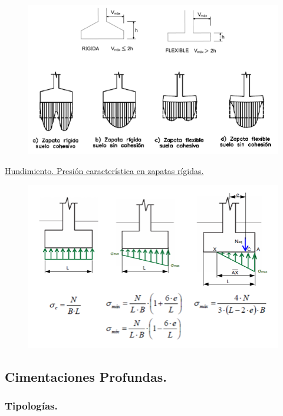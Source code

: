 \begin{figure}[H]
    \centering
    \includegraphics[width=1\linewidth]{Imagenes/Zapatas rigidas y flexibles.png}
\end{figure}

\noindent \underline{Hundimiento. Presión característica en zapatas rígidas.}

\begin{figure}[H]
    \centering
    \includegraphics[width=1\linewidth]{Imagenes/Presion caracteristica en zapatas rigidas.png}
\end{figure}

\subsection{Cimentaciones Profundas.}

\subsubsection{Tipologías.}

